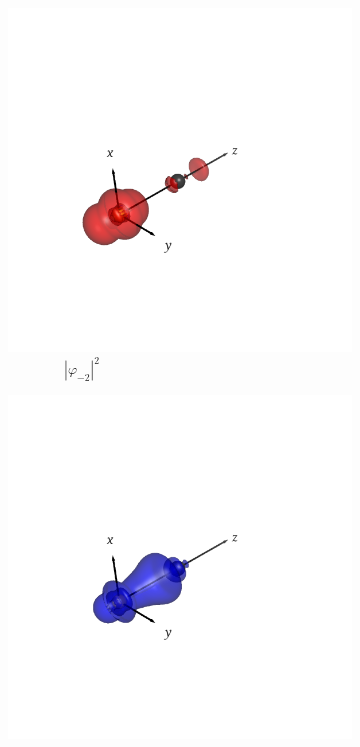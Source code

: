 \documentclass[journal=inoraj,manuscript=article]{achemso}
\begin{document}
\begin{figure}[!h]
    \vspace{0.0cm}
    \begin{subfigure}[t]{0.32\textwidth}
        \centering
        \includegraphics[width=\linewidth]{./AuCn+/nocv-3.png}
        \caption*{\ \ \ \ \ \ \ \ $|\varphi_{-2}|^2$}
    \end{subfigure}
    \hfill
    \begin{subfigure}[t]{0.32\textwidth}
        \centering
        \includegraphics[width=\linewidth]{./AuCn+/nocv+3.png}

\end{subfigure}
\end{figure}
\end{document}
